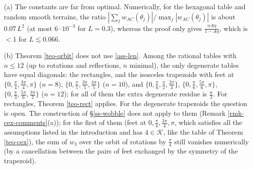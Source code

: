 \documentclass[a4paper,11pt,twoside,leqno]{article}
\numberwithin{equation}{section}
\begin{document}
\begin{rmk}\label{rmk-orbit-num}
(a) The constants are far from optimal. Numerically, for the hexagonal table and random smooth terrains, the ratio $|\sum_j w_{AC}(\theta_j)| / \max_j |w_{AC}(\theta_j)|$ is about $0.07\, L^2$ (at most $6\cdot 10^{-3}$ for $L = 0.3$), whereas the proof only gives $\frac{nA\eta}{1-A\eta}$, which is $< 1$ for $L \lesssim 0.066$.

(b) Theorem \ref{teo-orbit} does not use \eqref{ass-len}. Among the rational tables with $n \leq 12$ (up to rotations and reflections, $n$ minimal), the only degenerate tables have equal diagonals: the rectangles, and the isosceles trapezoids with feet at $\{0, \frac{\pi}{4}, \frac{3\pi}{4}, \pi\}$ ($n=8$), $\{0,\frac{\pi}{5}, \frac{3\pi}{5}, \frac{4\pi}{5}\}$ ($n=10$), and $\{0, \frac{\pi}{6}, \frac{\pi}{2}, \frac{2\pi}{3}\}$, $\{0, \frac{\pi}{6}, \frac{5\pi}{6}, \pi\}$, $\{0, \frac{\pi}{3}, \frac{5\pi}{6}, \frac{3\pi}{2}\}$ ($n=12$); for all of them the extra degenerate residue is $\frac{n}{2}$. For rectangles, Theorem \ref{teo-rect} applies. For the degenerate trapezoids the question is open. The construction of \S{}\ref{ss-wobble} does not apply to them (Remark \ref{rmk-cex-comments}(a)); for the first of them (feet at $0, \frac{\pi}{4}, \frac{3\pi}{4}, \pi$, which satisfies all the assumptions listed in the introduction and has $4 \in \mathcal{K}$, like the table of Theorem \ref{teo-cex}), the sum of $w_3$ over the orbit of rotations by $\frac{\pi}{4}$ still vanishes numerically (by a cancellation between the pairs of feet exchanged by the symmetry of the trapezoid).


\end{rmk}
\end{document}
